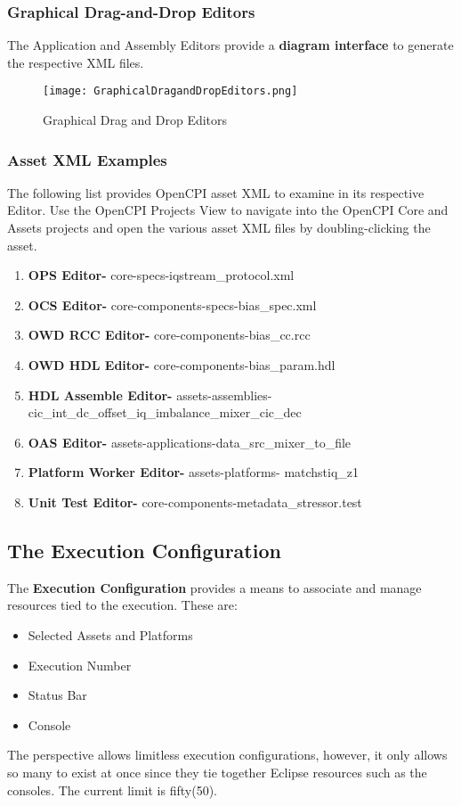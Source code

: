 \subsubsection{Graphical Drag-and-Drop Editors}
The Application and Assembly Editors provide a \textbf{diagram interface} to generate the respective XML files.
\begin{figure}[h!]
	\centering
	\caption{Graphical Drag and Drop Editors}\label{fig:GraphicalDragandDropEditors}
	\texttt{[image: GraphicalDragandDropEditors.png]}
 \end{figure}

\subsubsection{Asset XML Examples}
The following list provides OpenCPI asset XML to examine in its respective Editor. Use the OpenCPI Projects View to navigate into the OpenCPI Core and Assets projects and open the various asset XML files by doubling-clicking the asset. \\
\begin{enumerate}
\item	\textbf{OPS Editor-} core-specs-iqstream\_protocol.xml
\item	\textbf{OCS Editor-} core-components-specs-bias\_spec.xml
\item	\textbf{OWD RCC Editor-} core-components-bias\_cc.rcc
\item	\textbf{OWD HDL Editor-} core-components-bias\_param.hdl
\item	\textbf{HDL Assemble Editor-} assets-assemblies-cic\_int\_dc\_offset\_iq\_imbalance\_mixer\_cic\_dec
\item	\textbf{OAS Editor-} assets-applications-data\_src\_mixer\_to\_file
\item	\textbf{Platform Worker Editor-} assets-platforms- matchstiq\_z1
\item	\textbf{Unit Test Editor-} core-components-metadata\_stressor.test
\end{enumerate}

\subsection{The Execution Configuration}
The \textbf{Execution Configuration} provides a means to associate and manage resources tied to the execution. These are:
\begin{itemize}
\item	Selected Assets and Platforms
\item	Execution Number
\item	Status Bar
\item	Console
\end{itemize}
The perspective allows limitless execution configurations,  however,  it only allows so many to exist at once since they tie together Eclipse resources such as the consoles. The current limit is fifty(50). \\

